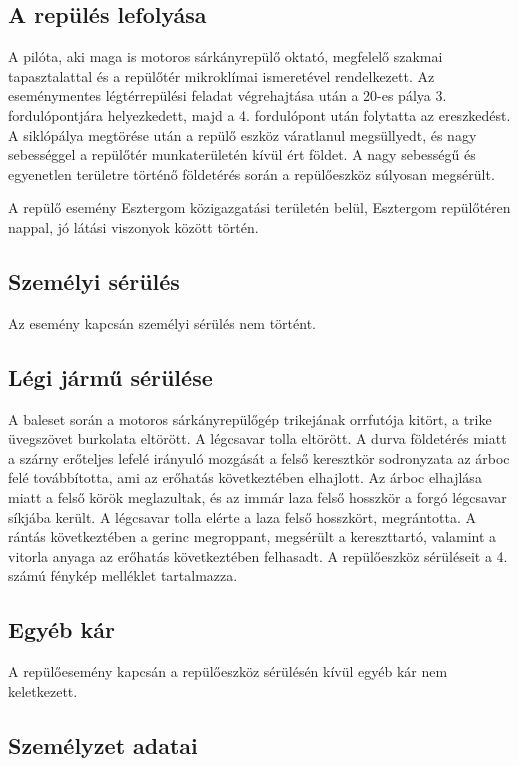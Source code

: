 \documentclass[a4paper,10pt]{article}
\begin{document}
\subsection{A repülés lefolyása}
A pilóta, aki maga is motoros sárkányrepülő oktató, megfelelő szakmai 
tapasztalattal és a repülőtér mikroklímai ismeretével rendelkezett. Az 
eseménymentes légtérrepülési feladat végrehajtása után a 20-es pálya 3. 
fordulópontjára helyezkedett, majd a 4. fordulópont után folytatta az 
ereszkedést. A siklópálya megtörése után a repülő eszköz váratlanul 
megsüllyedt, és nagy sebességgel a repülőtér munkaterületén kívül ért földet. A 
nagy sebességű és egyenetlen területre történő földetérés során a repülőeszköz 
súlyosan megsérült.

A repülő esemény Esztergom közigazgatási területén belül, Esztergom repülőtéren 
nappal, jó látási viszonyok között történ.

\subsection{Személyi sérülés}
Az esemény kapcsán személyi sérülés nem történt.

\subsection{Légi jármű sérülése}
A baleset során a motoros sárkányrepülőgép trikejának orrfutója kitört, a trike 
üvegszövet burkolata eltörött. A légcsavar tolla eltörött. A durva földetérés 
miatt a szárny erőteljes lefelé irányuló mozgását a felső keresztkör 
sodronyzata az árboc felé továbbította, ami az erőhatás következtében elhajlott.
Az árboc elhajlása miatt a felső körök meglazultak, és az 
immár laza felső hosszkör a forgó légcsavar síkjába került. A légcsavar tolla 
elérte a laza felső hosszkört, megrántotta. A rántás következtében a gerinc 
megroppant, megsérült a kereszttartó, valamint a vitorla anyaga az erőhatás 
következtében felhasadt.
A repülőeszköz sérüléseit a 4. számú fénykép melléklet tartalmazza.

\subsection{Egyéb kár}
A repülőesemény kapcsán a repülőeszköz sérülésén kívül egyéb kár nem 
keletkezett.

\subsection{Személyzet adatai}
\end{document}
